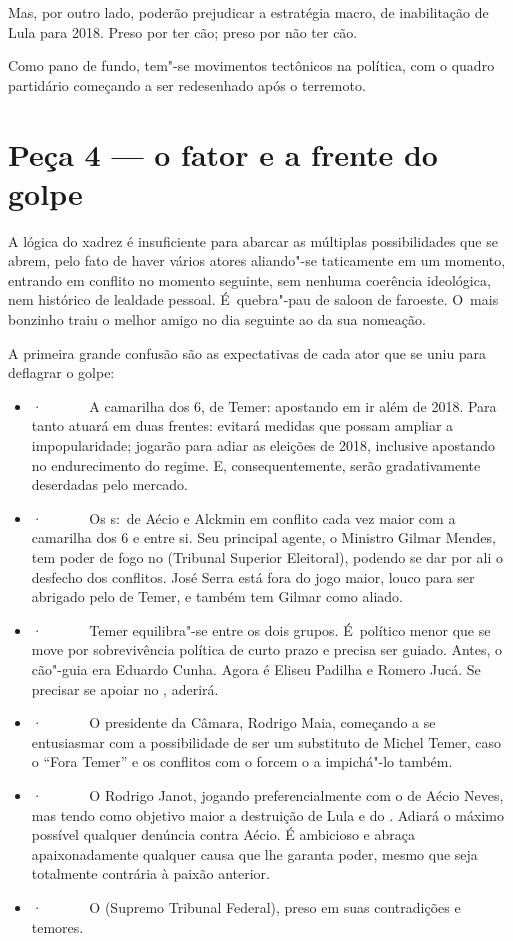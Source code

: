 Mas, por outro lado, poderão prejudicar a estratégia macro, de
inabilitação de Lula para 2018. Preso por ter cão; preso por não ter
cão.

Como pano de fundo, tem"-se movimentos tectônicos na política, com o
quadro partidário começando a ser redesenhado após o terremoto.

\section{Peça 4 --- o fator  e a frente do golpe}

A lógica do xadrez é insuficiente para abarcar as múltiplas
possibilidades que se abrem, pelo fato de haver vários atores aliando"-se
taticamente em um momento, entrando em conflito no momento seguinte, sem
nenhuma coerência ideológica, nem histórico de lealdade pessoal. É~quebra"-pau de saloon de faroeste. O~mais bonzinho traiu o melhor amigo
no dia seguinte ao da sua nomeação.

A primeira grande confusão são as expectativas de cada ator que se uniu
para deflagrar o golpe:

\begin{itemize}
\itemsep1pt\parskip0pt
\item
  ·~~~~~~ A camarilha dos 6, de Temer: apostando em ir além de 2018.
  Para tanto atuará em duas frentes: evitará medidas que possam ampliar
  a impopularidade; jogarão para adiar as eleições de 2018, inclusive
  apostando no endurecimento do regime. E, consequentemente, serão
  gradativamente deserdadas pelo mercado.
\item
  ·~~~~~~ Os s:~de Aécio e Alckmin em conflito cada vez maior com a
  camarilha dos 6 e entre si. Seu principal agente, o Ministro Gilmar
  Mendes, tem poder de fogo no  (Tribunal Superior Eleitoral),
  podendo se dar por ali o desfecho dos conflitos. José Serra está fora
  do jogo maior, louco para ser abrigado pelo  de Temer, e também
  tem Gilmar como aliado.
\item
  ·~~~~~~ Temer equilibra"-se entre os dois grupos. É~político menor que
  se move por sobrevivência política de curto prazo e precisa ser
  guiado. Antes, o cão"-guia era Eduardo Cunha. Agora é Eliseu Padilha e
  Romero Jucá. Se precisar se apoiar no , aderirá.
\item
  ·~~~~~~ O presidente da Câmara, Rodrigo Maia, começando a se
  entusiasmar com a possibilidade de ser um substituto de Michel Temer,
  caso o ``Fora Temer'' e os conflitos com o  forcem o  a
  impichá"-lo também.
\item
  ·~~~~~~ O  Rodrigo Janot, jogando preferencialmente com o  de
  Aécio Neves, mas tendo como objetivo maior a destruição de Lula e do
  . Adiará o máximo possível qualquer denúncia contra Aécio. É
  ambicioso e abraça apaixonadamente qualquer causa que lhe garanta
  poder, mesmo que seja totalmente contrária à paixão anterior.
\item
  ·~~~~~~ O  (Supremo Tribunal Federal), preso em suas contradições e
  temores.
\end{itemize}

